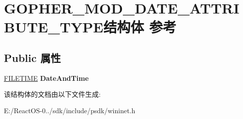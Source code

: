 \hypertarget{struct_g_o_p_h_e_r___m_o_d___d_a_t_e___a_t_t_r_i_b_u_t_e___t_y_p_e}{}\section{G\+O\+P\+H\+E\+R\+\_\+\+M\+O\+D\+\_\+\+D\+A\+T\+E\+\_\+\+A\+T\+T\+R\+I\+B\+U\+T\+E\+\_\+\+T\+Y\+P\+E结构体 参考}
\label{struct_g_o_p_h_e_r___m_o_d___d_a_t_e___a_t_t_r_i_b_u_t_e___t_y_p_e}
\subsection*{Public 属性}
\begin{DoxyCompactItemize}
\item 
\mbox{\label{struct_g_o_p_h_e_r___m_o_d___d_a_t_e___a_t_t_r_i_b_u_t_e___t_y_p_e_a8b65d7207f9af58098213f38064d135e}} 
\hyperlink{struct___f_i_l_e_t_i_m_e}{F\+I\+L\+E\+T\+I\+ME} {\bfseries Date\+And\+Time}
\end{DoxyCompactItemize}


该结构体的文档由以下文件生成\+:\begin{DoxyCompactItemize}
\item 
E\+:/\+React\+O\+S-\/0../sdk/include/psdk/wininet.\+h\end{DoxyCompactItemize}
